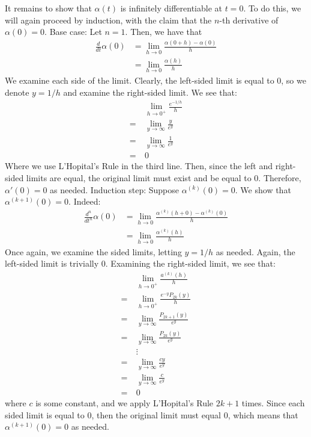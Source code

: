 \documentclass{article}
\begin{document}
\begin{soln}
    It remains to show that $ \alpha(t) $ is infinitely differentiable at $ t = 0 $.
    To do this, we will again proceed by induction, with the claim that
    the $ n $-th derivative of $ \alpha(0) = 0 $. \vsp
    Base case: Let $ n = 1 $.
    Then, we have that
    \begin{align*}
        \frac{d}{dt} \alpha(0) & = \lim_{h\rightarrow 0} \frac{\alpha(0 + h) - \alpha(0)}{h} \\
                               & = \lim_{h \rightarrow 0} \frac{\alpha(h)}{h}
    \end{align*}
    We examine each side of the limit.
    Clearly, the left-sided limit is equal to 0, so we 
    denote $ y = 1/h $ and examine the right-sided limit. We see that:
    \begin{align*}
        & \lim_{ h \rightarrow 0^{+}} \frac{e^{-1/h}}{h} \\
        = \ & \lim_{y \rightarrow \infty} \frac{y}{e^{y}} \\
        = \ & \lim_{y \rightarrow \infty} \frac{1}{e^{y}} \\
        = \ & 0
    \end{align*}
    Where we use L'Hopital's Rule in the third line.
    Then, since the left and right-sided limits are equal,
    the original limit must exist and be equal to 0.
    Therefore, $ \alpha'(0) = 0 $ as needed. \vsp
    Induction step: Suppose $ \alpha^{(k)}(0) = 0 $.
    We show that $ \alpha^{(k+1)}(0) = 0 $. Indeed:
    \begin{align*}
        \frac{d^{n}}{dt^{n}} \alpha(0) & = \lim_{h \rightarrow 0} 
        \frac{\alpha^{(k)}(h + 0) - \alpha^{(k)}(0)}{h} \\
                    & = \lim_{h \rightarrow 0} \frac{\alpha^{(k)}(h)}{h}
    \end{align*}
    Once again, we examine the sided limits, letting $ y = 1/h $ as needed.
    Again, the left-sided limit is trivially 0. Examining the right-sided limit, we see that:
    \begin{align*}
        & \lim_{h \rightarrow 0^{+}} \frac{a^{(k)}(h)}{h} \\
        = \ & \lim_{h \rightarrow 0^{+}} \frac{e^{-y}P_{2k}(y)}{h} \\
        = \ & \lim_{y \rightarrow \infty} \frac{P_{2k+1}(y)}{e^{y}} \\
        = \ & \lim_{y \rightarrow \infty} \frac{P_{2k}(y)}{e^{y}} \\
            & \vdots \\
        = \ & \lim_{y \rightarrow \infty} \frac{cy}{e^{y}} \\
        = \ & \lim_{y \rightarrow \infty} \frac{c}{e^{y}} \\
        = \ & 0
    \end{align*}
    where $ c $ is some constant, and we apply L'Hopital's Rule $ 2k + 1 $ times.
    Since each sided limit is equal to 0, then the original limit must equal 0,
    which means that $ \alpha^{(k+1)}(0) = 0 $ as needed. \npgh


\end{soln}
\end{document}
